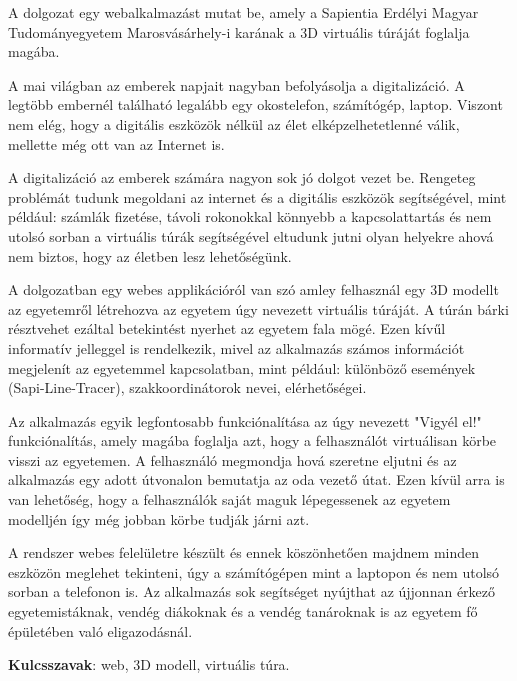 A dolgozat egy webalkalmazást mutat be, amely a Sapientia Erdélyi Magyar Tudományegyetem Marosvásárhely-i karának a 3D virtuális túráját foglalja magába. 

A mai világban az emberek napjait nagyban befolyásolja a digitalizáció. A legtöbb embernél található legalább egy okostelefon, számítógép, laptop. Viszont nem elég, hogy a digitális eszközök nélkül az élet elképzelhetetlenné válik, mellette még ott van az Internet is. 

A digitalizáció az emberek számára nagyon sok jó dolgot vezet be. Rengeteg problémát tudunk megoldani az internet és a digitális eszközök segítségével, mint például: számlák fizetése, távoli rokonokkal könnyebb a kapcsolattartás és nem utolsó sorban a virtuális túrák segítségével eltudunk jutni olyan helyekre ahová nem biztos, hogy az életben lesz lehetőségünk.

A dolgozatban egy webes applikációról van szó amley felhasznál egy 3D modellt az egyetemről létrehozva az egyetem úgy nevezett virtuális túráját. A túrán bárki résztvehet ezáltal betekintést nyerhet az egyetem fala mögé. Ezen kívűl informatív jelleggel is rendelkezik, mivel az alkalmazás számos információt megjelenít az egyetemmel kapcsolatban, mint például: különböző események (Sapi-Line-Tracer), szakkoordinátorok nevei, elérhetőségei.

Az alkalmazás egyik legfontosabb funkciónalítása az úgy nevezett "Vigyél el!" funkciónalítás, amely magába foglalja azt, hogy a felhasználót virtuálisan körbe visszi az egyetemen. A felhasználó megmondja hová szeretne eljutni és az alkalmazás egy adott útvonalon bemutatja az oda vezető útat. Ezen kívül arra is van lehetőség, hogy a felhasználók saját maguk lépegessenek az egyetem modelljén így még jobban körbe tudják járni azt.

A rendszer webes felelületre készült és ennek köszönhetően majdnem minden eszközön meglehet tekinteni, úgy a számítógépen mint a laptopon és nem utolsó sorban a telefonon is. Az alkalmazás sok segítséget nyújthat az újjonnan érkező egyetemistáknak, vendég diákoknak és a vendég tanároknak is az egyetem fő épületében való eligazodásnál. 

\textbf{Kulcsszavak}: web, 3D modell, virtuális túra.